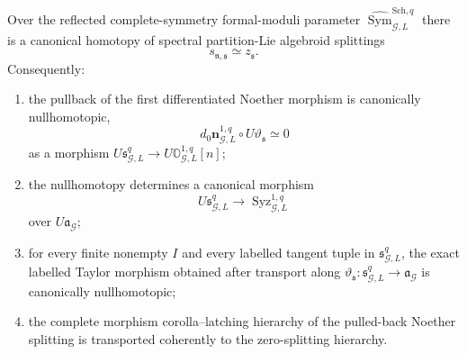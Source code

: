 \begin{theorem}
\label{thm:symmetry-noether-differentiated-brave-new-second-noether-theorem}
Over the reflected complete-symmetry formal-moduli parameter
$\widehat{\operatorname{Sym}}_{\mathcal G,L}^{\mathrm{Sch},q}$ there is a
canonical homotopy of spectral partition-Lie algebroid splittings
\[
\boxed{
s_{\mathfrak n,\mathfrak s}
\simeq
z_{\mathfrak s}.
}
\]
Consequently:
\begin{enumerate}
\item the pullback of the first differentiated Noether morphism is canonically
      nullhomotopic,
      \[
      \boxed{
      d_0\mathbf n_{\mathcal G,L}^{1,q}
      \circ
      U\vartheta_{\mathfrak s}
      \simeq
      0
      }
      \]
      as a morphism
      $U\mathfrak s_{\mathcal G,L}^{q}
      \to U\mathbb O_{\mathcal G,L}^{1,q}[n]$;
\item the nullhomotopy determines a canonical morphism
      \[
      U\mathfrak s_{\mathcal G,L}^{q}
      \longrightarrow
      \operatorname{Syz}_{\mathcal G,L}^{1,q}
      \]
      over $U\mathfrak a_{\mathcal G}$;
\item for every finite nonempty $I$ and every labelled tangent tuple in
      $\mathfrak s_{\mathcal G,L}^{q}$, the exact labelled Taylor morphism obtained
      after transport along
      $\vartheta_{\mathfrak s}:\mathfrak s_{\mathcal G,L}^{q}\to\mathfrak a_{\mathcal G}$
      is canonically nullhomotopic;
\item the complete morphism corolla--latching hierarchy of the pulled-back
      Noether splitting is transported coherently to the zero-splitting hierarchy.
\end{enumerate}
\end{theorem}


